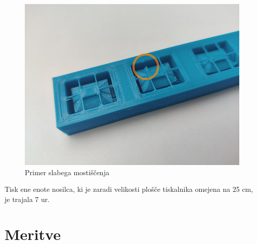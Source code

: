 \documentclass[12pt]{report}
\begin{document}
\begin{figure}[H]
  \centering
  \includegraphics[scale=0.4]{Images/mostiscenje_small.jpg}
  \caption{Primer slabega mostiščenja}
\end{figure}
\noindent Tisk ene enote nosilca, ki je zaradi velikosti plošče tiskalnika omejena na 25 cm, je trajala 7 ur.

\section{Meritve}


\printbibliography[heading=bibnumbered]
\end{document}
